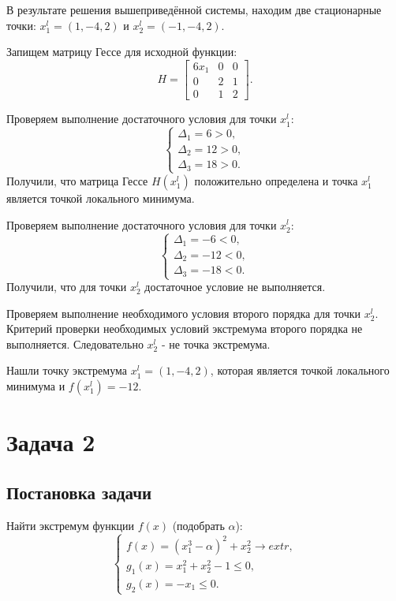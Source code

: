 \documentclass[12pt,a4paper,oneside]{extarticle}
\begin{document}
        В результате решения вышеприведённой системы, находим две стационарные точки: $x^l_1 = (1, -4, 2)$ и $x^l_2 = (-1, -4, 2)$.

        Запищем матрицу Гессе для исходной функции:
        $$
        H=\begin{bmatrix}
            6x_1 & 0 &0 \\
            0 & 2 & 1 \\
            0 & 1 & 2
        \end{bmatrix}.
        $$

        Проверяем выполнение достаточного условия для точки $x^l_1$:
        \begin{equation}
            \begin{cases}
               \Delta_1 = 6 > 0, \\
               \Delta_2 = 12 > 0, \\
               \Delta_3 = 18 > 0.
            \end{cases}
        \end{equation}
        Получили, что матрица Гессе $H(x^l_1)$ положительно определена и точка $x^l_1$ является точкой локального минимума.
        
        Проверяем выполнение достаточного условия для точки $x^l_2$:
        \begin{equation}
            \begin{cases}
               \Delta_1 = -6 < 0, \\
               \Delta_2 = -12 < 0, \\
               \Delta_3 = -18 < 0.
            \end{cases}
        \end{equation}
        Получили, что для точки $x^l_2$ достаточное условие не выполняется.

        Проверяем выполнение необходимого условия второго порядка для точки $x^l_2$. Критерий проверки необходимых условий экстремума второго порядка не выполняется. Следовательно $x^l_2$ - не точка экстремума.

        Нашли точку экстремума $x^l_1 = (1, -4, 2)$, которая является точкой локального минимума и $f(x^l_1) = -12$.

\section{Задача 2}
    \subsection{Постановка задачи}
        Найти экстремум функции $f(x)$ (подобрать $\alpha$):
        \begin{equation*}
            \begin{cases}
               f(x) = (x_1^3 - \alpha)^2 + x_2^2 \rightarrow extr, \\
               g_1(x) = x_1^2+x_2^2 - 1 \le 0, \\
               g_2(x) = -x_1 \le 0.
            \end{cases}
        \end{equation*}
\end{document}
